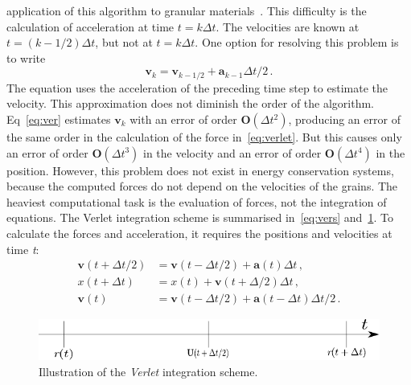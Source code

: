 application of this algorithm to granular materials~\citep{Radjai2011}. This 
difficulty is the calculation of acceleration at time $t=k\Delta t$. The 
velocities are known at $t=(k - 1/2) \Delta t$, but not at $t=k \Delta 
t$. One option for resolving this problem is to write
%
\begin{equation} 
\mathbf{v}_{\mathit{k}}={\mathbf{v}_{\mathit{k}-1/2}+{\mathbf{a}_{\mathit{k}-1}\Delta
 t/2}} \,.
\label{eq:ver}
\end{equation}
%
The equation uses the acceleration of the preceding time step to estimate the 
velocity. This approximation does not diminish the order of the 
algorithm. Eq~\ref{eq:ver} estimates $\mathbf{v}_{k}$ with an error of order 
$\mathbf{O}(\Delta t^{2})$, producing an error of the same order in the 
calculation of the force in~\cref{eq:verlet}. But this causes only an error of 
order $\mathbf{O}(\Delta t^{3})$ in the velocity and an error of order 
$\mathbf{O}(\Delta t^{4})$ in the position. However, this problem does not 
exist in energy conservation systems, because the computed forces do not depend 
on the velocities of the grains. The heaviest computational task is the 
evaluation of forces, not the integration of equations. The Verlet 
integration scheme is summarised in~\cref{eq:vers} and~\cref{fig:verlet}. To 
calculate the forces and acceleration, it requires the positions and velocities 
at time \textit{t}:
%
\begin{align}
\mathbf{v}(t+\Delta t/2) & =\mathbf{v}(t-\Delta t/2) + \mathbf{a}(t) \Delta t 
\nonumber \,, \\
x(t+\Delta t) & = x(t)+\mathbf{v}(t+\Delta /2) \Delta t  \,, \nonumber \\
 \mathbf{v}(t) & = \mathbf{v}(t-\Delta t /2)+\mathbf{a}(t- \Delta t) \Delta t 
 /2 \,.
\label{eq:vers}
\end{align}

\begin{figure}[tbhp]
\centering
\includegraphics{Leap}
\caption{Illustration of the \textit{Verlet} integration scheme.}
\label{fig:verlet}
\end{figure}

